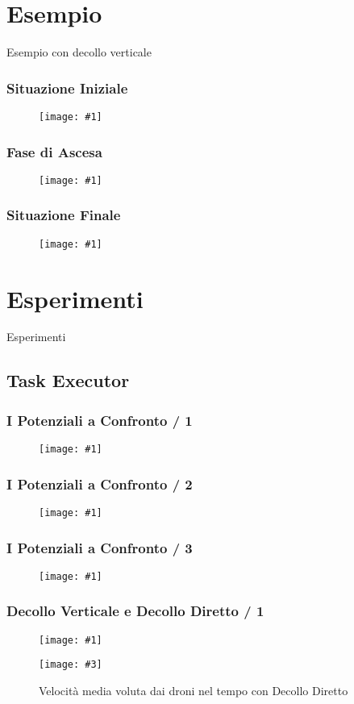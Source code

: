 \documentclass{beamer}
\newcommand{\putimage}[2] {
  \begin{figure}[H]
    \centering
    \texttt{[image: \#1]}
	\end{figure}
}
\newcommand{\putimagecouple}[4] {
  \begin{figure}[!htb]
    \centering
    \begin{minipage}{0.45\linewidth}
      \centering
      \texttt{[image: \#1]}
      \caption{#2}
    \end{minipage}
    \hspace{0.25cm}
    \begin{minipage}{0.45\linewidth}
      \centering
      \texttt{[image: \#3]}
      \caption{#4}
    \end{minipage}
  \end{figure}
}
\begin{document}
\section{Esempio}
\begin{frame}
\centering
\Huge
Esempio con decollo verticale
\end{frame}

\begin{frame}
\frametitle{Situazione Iniziale}
\putimage{images/esempio/iterazione\_zero\_left.png}{0.85}
\end{frame}

\begin{frame}
\frametitle{Fase di Ascesa}
\putimage{images/esempio/iterazione\_venti\_left.png}{0.85}
\end{frame}

\begin{frame}
\frametitle{Situazione Finale}
\putimage{images/esempio/iterazione\_finale\_top.png}{0.85}
\end{frame}

\section{Esperimenti}
\begin{frame}
\centering
\Huge
Esperimenti
\end{frame}

\subsection{Task Executor}

\begin{frame}
\frametitle{I Potenziali a Confronto / 1}
  \putimage{images/slides/task-executor-noiseless-vertical/MeanDistanceFromTarget.png}{0.66}
\end{frame}

\begin{frame}
\frametitle{I Potenziali a Confronto / 2}
\putimage{images/slides/task-executor-noiseless-vertical/MeanDistancesWithinSquadron.png}{0.66}
\end{frame}

\begin{frame}
\frametitle{I Potenziali a Confronto / 3}
\putimage{images/slides/task-executor-noiseless-vertical/MinDistancesGlobally.png}{0.66}
\end{frame}

\begin{frame}
\frametitle{Decollo Verticale e Decollo Diretto / 1}
\putimagecouple{images/slides/task-executor-noiseless-vertical/MeanSpeed.png}{Velocit\`a media voluta dai droni nel tempo con Decollo Verticale}
               {images/slides/task-executor-noiseless-direct/MeanSpeed.png}{Velocit\`a media voluta dai droni nel tempo con Decollo Diretto}
\end{frame}
\end{document}
